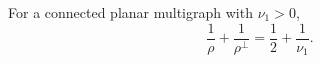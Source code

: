 For a connected planar multigraph with $\nu_1 > 0$,
$$\frac{1}{\rho} + \frac{1}{\rho^{\perp}} = \frac{1}{2} + \frac{1}{\nu_1}.$$

